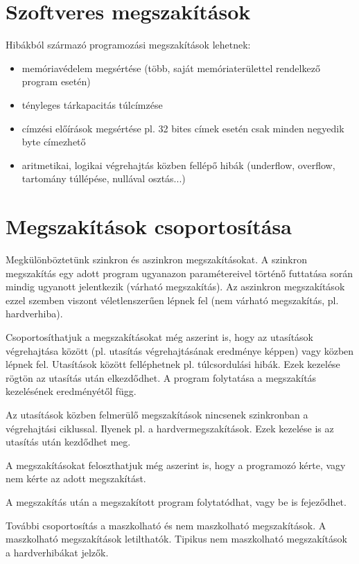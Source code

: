 \section{Szoftveres megszakítások}
Hibákból származó programozási megszakítások lehetnek:
\begin{itemize}
    \item memóriavédelem megsértése (több, saját memóriaterülettel rendelkező program esetén)
    \item tényleges tárkapacitás túlcímzése
    \item címzési előírások megsértése pl. 32 bites címek esetén csak minden negyedik byte címezhető
    \item aritmetikai, logikai végrehajtás közben fellépő hibák (underflow, overflow, tartomány túllépése, nullával osztás...)
\end{itemize}

\section{Megszakítások csoportosítása}
Megkülönböztetünk szinkron és aszinkron megszakításokat.
A szinkron megszakítás egy adott program ugyanazon paramétereivel történő futtatása során mindig ugyanott jelentkezik (várható megszakítás).
Az aszinkron megszakítások ezzel szemben viszont véletlenszerűen lépnek fel (nem várható megszakítás, pl. hardverhiba).

Csoportosíthatjuk a megszakításokat még aszerint is, hogy az utasítások végrehajtása között (pl. utasítás végrehajtásának eredménye képpen) vagy közben lépnek fel.
Utasítások között felléphetnek pl. túlcsordulási hibák.
Ezek kezelése rögtön az utasítás után elkezdődhet.
A program folytatása a megszakítás kezelésének eredményétől függ.

Az utasítások közben felmerülő megszakítások nincsenek szinkronban a végrehajtási ciklussal.
Ilyenek pl. a hardvermegszakítások.
Ezek kezelése is az utasítás után kezdődhet meg.

A megszakításokat feloszthatjuk még aszerint is, hogy a programozó kérte, vagy nem kérte az adott megszakítást.

A megszakítás után a megszakított program folytatódhat, vagy be is fejeződhet.

További csoportosítás a maszkolható és nem maszkolható megszakítások.
A maszkolható megszakítások letilthatók.
Tipikus nem maszkolható megszakítások a hardverhibákat jelzők.

